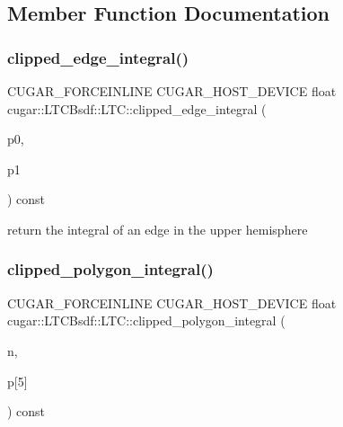\subsection{Member Function Documentation}
\mbox{\label{structcugar_1_1_l_t_c_bsdf_1_1_l_t_c_aa7d8ebf1030edf67ea3fb293a536e63a}} 
\subsubsection{\texorpdfstring{clipped\+\_\+edge\+\_\+integral()}{clipped\_edge\_integral()}}
{\footnotesize\ttfamily C\+U\+G\+A\+R\+\_\+\+F\+O\+R\+C\+E\+I\+N\+L\+I\+NE C\+U\+G\+A\+R\+\_\+\+H\+O\+S\+T\+\_\+\+D\+E\+V\+I\+CE float cugar\+::\+L\+T\+C\+Bsdf\+::\+L\+T\+C\+::clipped\+\_\+edge\+\_\+integral (\begin{DoxyParamCaption}\item[{const \hyperlink{structcugar_1_1_vector}{cugar\+::\+Vector3f}}]{p0,  }\item[{const \hyperlink{structcugar_1_1_vector}{cugar\+::\+Vector3f}}]{p1 }\end{DoxyParamCaption}) const\hspace{0.3cm}{\ttfamily [inline]}}

return the integral of an edge in the upper hemisphere \mbox{\label{structcugar_1_1_l_t_c_bsdf_1_1_l_t_c_a394cb2a772f4567ab0d4ca9b9b13d0bc}} 
\subsubsection{\texorpdfstring{clipped\+\_\+polygon\+\_\+integral()}{clipped\_polygon\_integral()}}
{\footnotesize\ttfamily C\+U\+G\+A\+R\+\_\+\+F\+O\+R\+C\+E\+I\+N\+L\+I\+NE C\+U\+G\+A\+R\+\_\+\+H\+O\+S\+T\+\_\+\+D\+E\+V\+I\+CE float cugar\+::\+L\+T\+C\+Bsdf\+::\+L\+T\+C\+::clipped\+\_\+polygon\+\_\+integral (\begin{DoxyParamCaption}\item[{const uint32}]{n,  }\item[{const \hyperlink{structcugar_1_1_vector}{cugar\+::\+Vector3f}}]{p\mbox{[}5\mbox{]} }\end{DoxyParamCaption}) const\hspace{0.3cm}{\ttfamily [inline]}}

